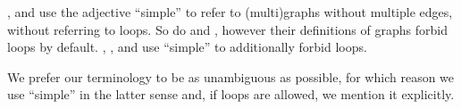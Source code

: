 \begin{remark}
  ,  and  use the adjective \enquote{simple} to refer to (multi)graphs without multiple edges, without referring to loops. So do  and , however their definitions of graphs forbid loops by default. , ,  and  use \enquote{simple} to additionally forbid loops.

  We prefer our terminology to be as unambiguous as possible, for which reason we use \enquote{simple} in the latter sense and, if loops are allowed, we mention it explicitly.
\end{remark}

